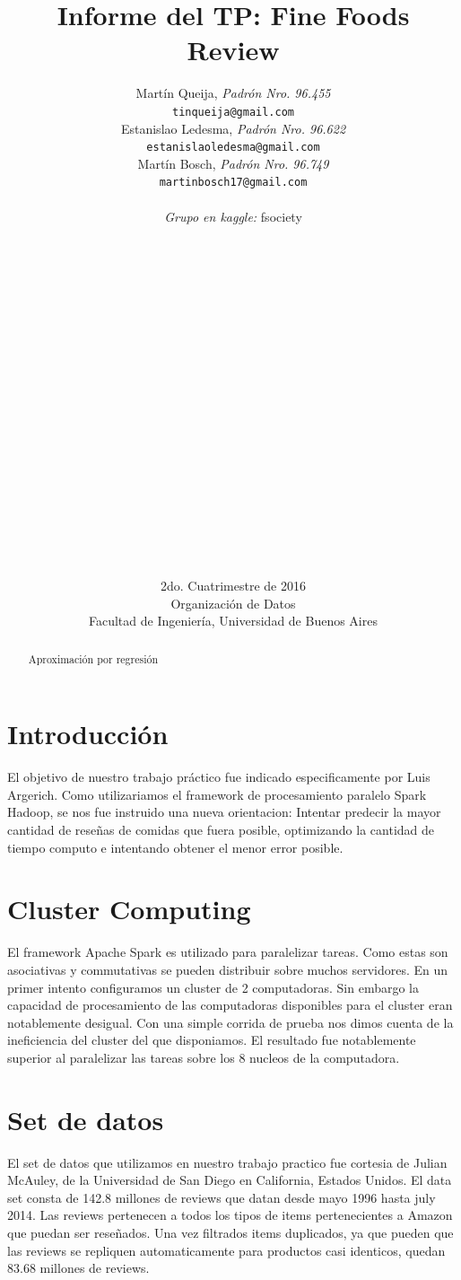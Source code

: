 \documentclass[a4paper,10pt]{article}
\title{	\textbf{Informe del TP: Fine Foods Review} }
\author{
    Mart\'{i}n Queija, \textit{Padr\'{o}n Nro. 96.455} \\
	\texttt{ tinqueija@gmail.com } \\[2.5ex]
	Estanislao Ledesma, \textit{Padr\'{o}n Nro. 96.622} \\
	\texttt{ estanislaoledesma@gmail.com } \\[2.5ex]
	Mart\'{i}n Bosch, \textit{Padr\'{o}n Nro. 96.749} \\
	\texttt{ martinbosch17@gmail.com } \\[2.5ex]
	\\
	\textit{Grupo en kaggle:} fsociety \\
	\\
	\\
	\\
	\\
	\\
	\\
	\\
	\\
	\\
	\\
	\\
	\\
	\\
	\\
	\\
	\\
	\\
	\\
	\\
	\\
	\normalsize{2do. Cuatrimestre de 2016} \\
	\normalsize{ Organizaci\'{o}n de Datos } \\
	\normalsize{ Facultad de Ingenier\'{i}a, Universidad de Buenos Aires } \\
}
\date{}
\begin{document}
	\maketitle
	\thispagestyle{empty}   %


	\begin{abstract}
		\centerline{Aproximaci\'{o}n por regresi\'{o}n}
		
	\end{abstract}
	\newpage
	
	\tableofcontents
	
	
	\section{Introducci\'{o}n}
	
	El objetivo de nuestro trabajo pr\'{a}ctico fue indicado especificamente por Luis Argerich. Como utilizariamos el framework de procesamiento paralelo Spark Hadoop, se nos fue instruido una nueva orientacion: Intentar predecir la mayor cantidad de rese\~{n}as de comidas que fuera posible, optimizando la cantidad de tiempo computo e intentando obtener el menor error posible.
	
	\section{Cluster Computing}
	
	El framework Apache Spark es utilizado para paralelizar tareas. Como estas son asociativas y commutativas se pueden distribuir sobre muchos servidores. En un primer intento configuramos un cluster de 2 computadoras. Sin embargo la capacidad de procesamiento de las computadoras disponibles para el cluster eran notablemente desigual. Con una simple corrida de prueba nos dimos cuenta de la ineficiencia del cluster del que disponiamos. El resultado fue notablemente superior al paralelizar las tareas sobre los 8 nucleos de la computadora.
	
	\section{Set de datos}
	
	El set de datos que utilizamos en nuestro trabajo practico fue cortesia de Julian McAuley, de la Universidad de San Diego en California, Estados Unidos. El data set consta de 142.8 millones de reviews que datan desde mayo 1996 hasta july 2014. Las reviews pertenecen a todos los tipos de items pertenecientes a Amazon que puedan ser rese\~{n}ados. Una vez filtrados items duplicados, ya que pueden que las reviews se repliquen automaticamente para productos casi identicos, quedan 83.68 millones de reviews.
	
\end{document}

